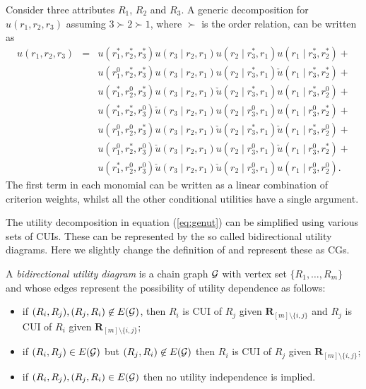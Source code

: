 \begin{example}
\label{ex:genut}
Consider three attributes $R_1$, $R_2$ and $R_3$. A generic decomposition for $u(r_1,r_2,r_3)$ assuming $3\succ 2\succ 1$, where $\succ$ is the order relation, can be written as
\begin{eqnarray}
u(r_1,r_2,r_3)&=&u(r_1^*,r_2^*,r_3^*)u(r_3\;|\;r_2,r_1)u(r_2\;|\; r_3^*,r_1)u(r_1\;|\; r_3^*,r_2^*)+\nonumber\\
&&u(r_1^0,r_2^*,r_3^*)u(r_3\;|\;r_2,r_1)u(r_2\;|\; r_3^*,r_1)\check{u}(r_1\;|\; r_3^*,r_2^*)+\nonumber\\
&&u(r_1^*,r_2^0,r_3^*)u(r_3\;|\;r_2,r_1)\check{u}(r_2\;|\; r_3^*,r_1)u(r_1\;|\; r_3^*,r_2^0)+\nonumber\\
&&u(r_1^*,r_2^*,r_3^0)\check{u}(r_3\;|\;r_2,r_1)u(r_2\;|\; r_3^0,r_1)u(r_1\;|\; r_3^0,r_2^*)+\nonumber\\
&&u(r_1^0,r_2^0,r_3^*)u(r_3\;|\;r_2,r_1)\check{u}(r_2\;|\; r_3^*,r_1)\check{u}(r_1\;|\; r_3^*,r_2^0)+\nonumber\\
&&u(r_1^0,r_2^*,r_3^0)\check{u}(r_3\;|\;r_2,r_1)u(r_2\;|\; r_3^0,r_1)\check{u}(r_1\;|\; r_3^0,r_2^*)+\nonumber\\
&&u(r_1^*,r_2^0,r_3^0)\check{u}(r_3\;|\;r_2,r_1)\check{u}(r_2\;|\; r_3^0,r_1)u(r_1\;|\; r_3^0,r_2^0).\label{eq:puiexample1}
\end{eqnarray}
The first term in each monomial can be written as a linear combination of criterion weights, whilst all the other conditional utilities have a single argument.
\end{example}

The utility decomposition in equation (\ref{eq:genut}) can be simplified using various sets of CUIs. These can be represented by the so called bidirectional utility diagrams. Here we slightly change the definition of \citet{Abbas2010} and represent these as CGs.

\begin{definition}
A \emph{bidirectional utility diagram} is a chain graph $\mathcal{G}$ with vertex set $\{R_1,\dots,R_m\}$ and whose edges represent the possibility of utility dependence as follows:
\begin{itemize}
\item if $(R_i,R_j),(R_j,R_i)\not\in E(\mathcal{G})$, then $R_i$ is CUI of $R_j$ given $\bm{R}_{[m]\setminus \{i,j\}}$ and  $R_j$ is CUI of $R_i$ given  $\bm{R}_{[m]\setminus \{i,j\}}$;
\item if $(R_i,R_j)\in E(\mathcal{G})$ but $(R_j,R_i)\not\in E(\mathcal{G})$ then  $R_i$ is CUI of $R_j$ given $\bm{R}_{[m]\setminus \{i,j\}}$;
\item if $(R_i,R_j),(R_j,R_i)\in E(\mathcal{G})$ then no utility independence is implied.
\end{itemize}
\end{definition}



